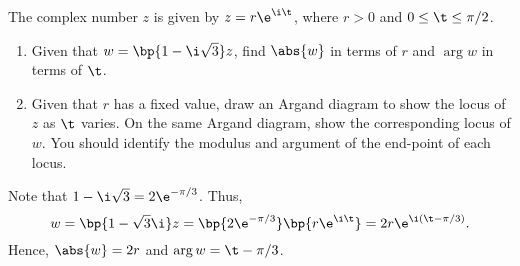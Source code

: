 \begin{problem}
    The complex number $z$ is given by $z = r\e^{\i \t}$, where $r > 0$ and $0 \leq \t \leq \pi/2$.

    \begin{enumerate}
        \item Given that $w = \bp{1 - \i \sqrt3}z$, find $\abs{w}$ in terms of $r$ and $\arg w$ in terms of $\t$.
        \item Given that $r$ has a fixed value, draw an Argand diagram to show the locus of $z$ as $\t$ varies. On the same Argand diagram, show the corresponding locus of $w$. You should identify the modulus and argument of the end-point of each locus.
    \end{enumerate}
\end{problem}
\begin{solution}
    \begin{ppart}
        Note that $1 - \i \sqrt{3} = 2\e^{-\pi/3}$. Thus, \[w = \bp{1 - \sqrt3 \i} z = \bp{2\e^{-\pi/3}}\bp{r \e^{\i \t}} = 2r \e^{\i (\t - \pi/3)}.\] Hence, $\abs{w} = 2r$ and $\arg{w} = \t - \pi/3$.
    \end{ppart}
    \begin{ppart}
        \begin{center}
\end{center}
\end{ppart}
\end{solution}
